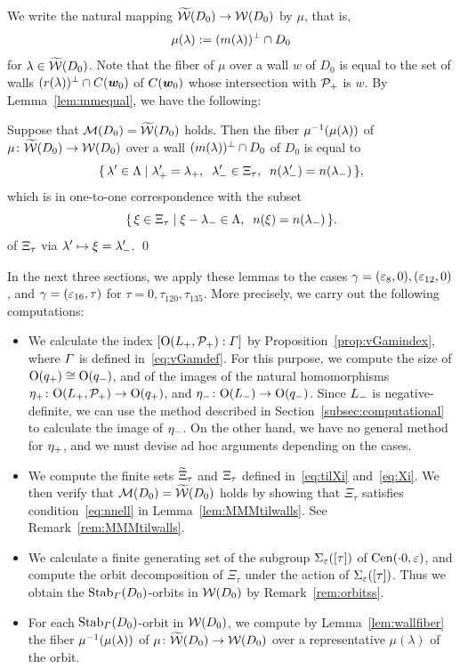 \documentclass{amsart} %
\begin{document}
%
We write the natural mapping
$\widetilde{\mathord{\mathcal{W}}}(D_0)\to \mathord{\mathcal{W}}(D_0)$
by $\mu$, that is, 
\[
\mu(\lambda):=(m(\lambda))^{\perp}\cap D_0
\]
for $\lambda\in \widetilde{\mathord{\mathcal{W}}}(D_0)$.
Note that the fiber of $\mu$ over a wall $w$
of $D_0$ is equal to the set of walls $(r(\lambda))^{\perp}\cap \mathord{C}(\boldsymbol{w}_0)$
of $\mathord{C}(\boldsymbol{w}_0)$ whose intersection with $\mathord{\mathcal{P}}_{+}$ is $w$.
By Lemma~\ref{lem:mmequal}, we have the following:
%
\begin{lemma}\label{lem:wallfiber}
Suppose that $\mathord{\mathcal{M}}(D_0)=\widetilde{\mathord{\mathcal{W}}} (D_0)$ holds.
Then the fiber $\mu^{-1}(\mu(\lambda))$ of %
$\mu\colon \widetilde{\mathord{\mathcal{W}}}(D_0)\to \mathord{\mathcal{W}}(D_0)$
over a wall $(m(\lambda))^{\perp}\cap D_0$ of $D_0$
is equal to
\[
\set{\lambda\sprime\in \Leech}%
{\lambdaplus\sprime=\lambdaplus, \;\; \lambdaminus\sprime\in \Xitau, \;\; n(\lambdaminus\sprime)=n(\lambdaminus)},
\]
which is in one-to-one correspondence with the subset 
\[
\{\,{\xi\in \Xi_{\tau}}\mid {\xi-{\lambda}_{-}\in \Lambda, \;\; n(\xi)=n({\lambda}_{-})} \,\}.
\]
of $\Xi_{\tau}$ via $\lambda^{\prime} \mapsto \xi={\lambda}_{-}^{\prime}$.
\qed
\end{lemma}
%
In the next three sections, we apply these lemmas to the cases $\gamma=(\varepsilon_8, 0), (\varepsilon_{12}, 0)$,
and $\gamma=(\varepsilon_{16}, \tau)$ for $\tau=0, \tau_{120}, \tau_{135}$.
More precisely,
we carry out the following computations:
%
\begin{itemize}
\item 
We calculate the index $[\mathord{\mathrm{O}}(L_{+}, \mathord{\mathcal{P}}_{+}): \varGamma]$ 
by Proposition~\ref{prop:vGamindex},
where $\varGamma$ is defined in~\eqref{eq:vGamdef}.
 For this purpose, 
we compute the size of $\mathord{\mathrm{O}}(q_{+})\cong \mathord{\mathrm{O}}(q_{-})$, 
and of 
the images of the natural homomorphisms 
${\eta}_{+}\colon \mathord{\mathrm{O}}(L_{+}, \mathord{\mathcal{P}}_{+})\to \mathord{\mathrm{O}}(q_{+})$, 
and
${\eta}_{-}\colon \mathord{\mathrm{O}}(L_{-})\to \mathord{\mathrm{O}}(q_{-})$.
Since $L_{-}$ is negative-definite,
we can use the method described in Section~\ref{subsec:computational}
to calculate the image of ${\eta}_{-}$.
On the other hand, 
we have no general method for ${\eta}_{+}$, and we must devise ad hoc arguments depending on the cases.
\item 
We compute the finite sets $\widetilde{\Xi}_{\tau}$ and $\Xi_{\tau}$
defined in~\eqref{eq:tilXi} and~\eqref{eq:Xi}.
%
%
We then verify that $\mathord{\mathcal{M}}(D_0)=\widetilde{\mathord{\mathcal{W}}} (D_0)$ holds
by showing that $\Xi_{\tau}$ satisfies condition~\eqref{eq:nnell}
in Lemma~\ref{lem:MMMtilwalls}.
See Remark~\ref{rem:MMMtilwalls}.
\item 
We calculate a finite generating set of 
the subgroup $\Sigma_{\varepsilon}([\tau])$ of $\mathrm{Cen}(\cdot 0, \varepsilon)$,
and compute the orbit decomposition of $\Xi_{\tau}$ under the action of $\Sigma_{\varepsilon}([\tau])$.
Thus we obtain 
the $\operatorname{Stab}_{\varGamma}(D_0)$-orbits in $\mathord{\mathcal{W}}(D_0)$
by Remark~\ref{rem:orbitss}.
\item
For each $\operatorname{Stab}_{\varGamma}(D_0)$-orbit in $\mathord{\mathcal{W}}(D_0)$,
we compute by Lemma~\ref{lem:wallfiber} the fiber $\mu^{-1}(\mu(\lambda))$ of $\mu\colon \widetilde{\mathord{\mathcal{W}}}(D_0)\to \mathord{\mathcal{W}}(D_0)$
over a representative $\mu(\lambda)$ of the orbit.
\end{itemize}
\end{document}
